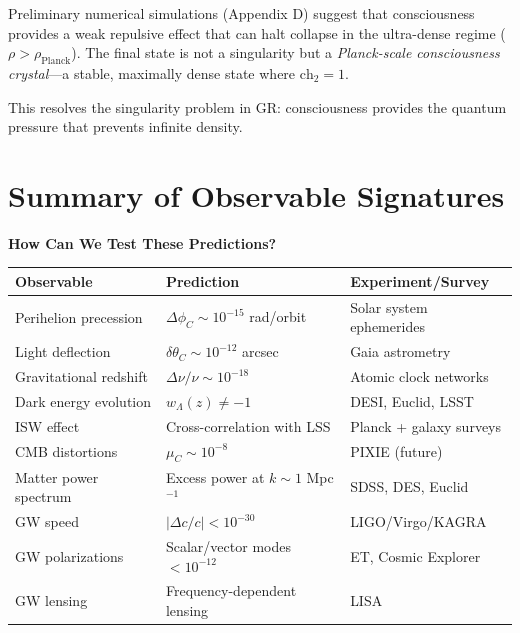 \begin{keyidea}
Preliminary numerical simulations (Appendix D) suggest that consciousness provides a weak repulsive effect that can halt collapse in the ultra-dense regime ($\rho > \rho_{\text{Planck}}$). The final state is not a singularity but a \textit{Planck-scale consciousness crystal}---a stable, maximally dense state where $\text{ch}_2 = 1$.

This resolves the singularity problem in GR: consciousness provides the quantum pressure that prevents infinite density.
\end{keyidea}

\section{Summary of Observable Signatures}

\begin{level2}
\textbf{How Can We Test These Predictions?}

\begin{center}
\begin{tabular}{@{} l l l @{}}
\toprule
\textbf{Observable} & \textbf{Prediction} & \textbf{Experiment/Survey} \\
\midrule
Perihelion precession & $\Delta \phi_C \sim 10^{-15}$ rad/orbit & Solar system ephemerides \\
Light deflection & $\delta\theta_C \sim 10^{-12}$ arcsec & Gaia astrometry \\
Gravitational redshift & $\Delta\nu/\nu \sim 10^{-18}$ & Atomic clock networks \\
\midrule
Dark energy evolution & $w_\Lambda(z) \neq -1$ & DESI, Euclid, LSST \\
ISW effect & Cross-correlation with LSS & Planck + galaxy surveys \\
CMB distortions & $\mu_C \sim 10^{-8}$ & PIXIE (future) \\
Matter power spectrum & Excess power at $k \sim 1$ Mpc$^{-1}$ & SDSS, DES, Euclid \\
\midrule
GW speed & $|\Delta c/c| < 10^{-30}$ & LIGO/Virgo/KAGRA \\
GW polarizations & Scalar/vector modes $< 10^{-12}$ & ET, Cosmic Explorer \\
GW lensing & Frequency-dependent lensing & LISA \\
\bottomrule
\end{tabular}
\label{tab:observables-summary}
\end{center}
\end{level2}

